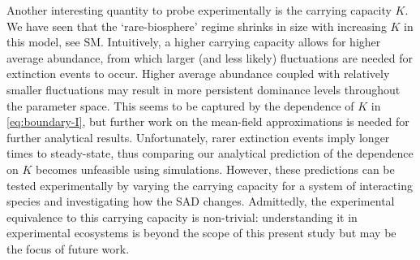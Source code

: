 \documentclass[9pt,twocolumn,twoside,lineno]{pnas-new}
\begin{document}
Another interesting quantity to probe experimentally is the carrying capacity $K$.
We have seen that the `rare-biosphere' regime shrinks in size with increasing $K$ in this model, see SM.
Intuitively, a higher carrying capacity allows for higher average abundance, from which larger (and less likely) fluctuations are needed for extinction events to occur.
Higher average abundance coupled with relatively smaller fluctuations may result in more persistent dominance levels throughout the parameter space.
This seems to be captured by the dependence of $K$ in \eqref{eq:boundary-I}, but further work on the mean-field approximations is needed %
for further analytical results.
Unfortunately, rarer extinction events imply longer times to steady-state, thus comparing our analytical prediction of the dependence on $K$ becomes unfeasible using simulations.
However, these predictions can be tested experimentally by varying the carrying capacity for a system of interacting species and investigating how the SAD changes.
Admittedly, the experimental equivalence to this carrying capacity is %
non-trivial: understanding it in experimental ecosystems is beyond the scope of this present study but may be the focus of future work. %
\end{document}
